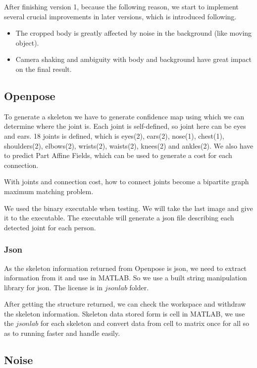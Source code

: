 \documentclass[11pt,twocolumn,letterpaper]{article}
\begin{document}
		\par
		After finishing version 1, because the following reason, we start to implement several crucial improvements in later versions, which is introduced following.
		\begin{itemize}
		\item The cropped body is greatly affected by noise in the background (like moving object).
		\item Camera shaking and ambiguity with body and background have great impact on the final result.
		\end{itemize}
	\subsection{Openpose\cite{cao2017realtime}}
	    \par To generate a skeleton we have to generate confidence map using which we can determine where the joint is.
		Each joint is self-defined, so joint here can be eyes and ears.
		18 joints is defined, which is eyes(2), ears(2), nose(1), chest(1), shoulders(2), elbows(2), wrists(2), waists(2), knees(2) and ankles(2).
		We also have to predict Part Affine Fields, which can be used to generate a cost for each connection.
		\par With joints and connection cost, how to connect joints become a bipartite graph maximum matching problem.
		\par We used the binary executable\cite{cao2017realtime} when testing. We will take the last image and give it to the executable. The executable will generate a json file describing each detected joint for each person.
	    \subsubsection{Json}
        \par As the skeleton information returned from Openpose is json, we need to extract information from it and use in MATLAB. So we use a built string manipulation library for json. The license is in $jsonlab$ folder.
        \par After getting the structure returned, we can check the workspace and withdraw the skeleton information. Skeleton data stored form is cell in MATLAB, we use the $jsonlab$ for each skeleton and convert data from cell to matrix once for all so as to running faster and handle easily.

	\subsection{Noise}
\par
\end{document}
